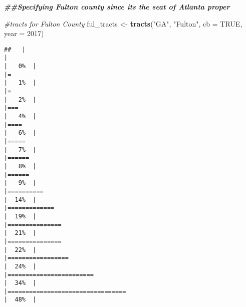\documentclass[
]{article}
\newenvironment{Shaded}{\begin{snugshade}}{\end{snugshade}}
\newcommand{\AttributeTok}[1]{\textcolor[rgb]{0.13,0.29,0.53}{#1}}
\newcommand{\CommentTok}[1]{\textcolor[rgb]{0.56,0.35,0.01}{\textit{#1}}}
\newcommand{\ConstantTok}[1]{\textcolor[rgb]{0.56,0.35,0.01}{#1}}
\newcommand{\DecValTok}[1]{\textcolor[rgb]{0.00,0.00,0.81}{#1}}
\newcommand{\DocumentationTok}[1]{\textcolor[rgb]{0.56,0.35,0.01}{\textbf{\textit{#1}}}}
\newcommand{\FunctionTok}[1]{\textcolor[rgb]{0.13,0.29,0.53}{\textbf{#1}}}
\newcommand{\NormalTok}[1]{#1}
\newcommand{\OtherTok}[1]{\textcolor[rgb]{0.56,0.35,0.01}{#1}}
\newcommand{\StringTok}[1]{\textcolor[rgb]{0.31,0.60,0.02}{#1}}
\begin{document}
\begin{verbatim}
\end{verbatim}

\begin{Shaded}
\begin{Highlighting}[]
\DocumentationTok{\#\#Specifying Fulton county since its the seat of Atlanta proper}

\CommentTok{\#tracts for Fulton County}
\NormalTok{ful\_tracts }\OtherTok{\textless{}{-}} \FunctionTok{tracts}\NormalTok{(}\StringTok{"GA"}\NormalTok{, }\StringTok{"Fulton"}\NormalTok{, }\AttributeTok{cb =} \ConstantTok{TRUE}\NormalTok{, }\AttributeTok{year =} \DecValTok{2017}\NormalTok{)}
\end{Highlighting}
\end{Shaded}

\begin{verbatim}
##   |                                                                              |                                                                      |   0%  |                                                                              |=                                                                     |   1%  |                                                                              |=                                                                     |   2%  |                                                                              |===                                                                   |   4%  |                                                                              |====                                                                  |   6%  |                                                                              |=====                                                                 |   7%  |                                                                              |======                                                                |   8%  |                                                                              |======                                                                |   9%  |                                                                              |==========                                                            |  14%  |                                                                              |=============                                                         |  19%  |                                                                              |===============                                                       |  21%  |                                                                              |===============                                                       |  22%  |                                                                              |=================                                                     |  24%  |                                                                              |========================                                              |  34%  |                                                                              |=================================                                     |  48%  |                                                                
\end{verbatim}
\end{document}
